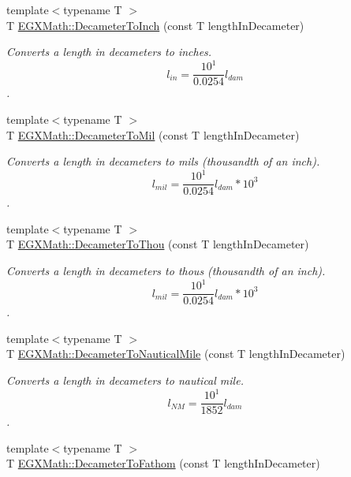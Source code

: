 \begin{DoxyCompactItemize}
{\footnotesize template$<$typename T $>$ }\\T \mbox{\hyperlink{group___e_g_x_math-_conversions-_length_conversions-_s_i-_decameter-_imperial_ga246ab50e821640008d965b5690226df5}{E\+G\+X\+Math\+::\+Decameter\+To\+Inch}} (const T length\+In\+Decameter)
\begin{DoxyCompactList}\small\item\em Converts a length in decameters to inches. \[ l_{in}= \frac{10^{1}}{0.0254} l_{dam} \]. \end{DoxyCompactList}\item 
{\footnotesize template$<$typename T $>$ }\\T \mbox{\hyperlink{group___e_g_x_math-_conversions-_length_conversions-_s_i-_decameter-_imperial_gaee77251b6c2f2e8e0feae0032e80e0c3}{E\+G\+X\+Math\+::\+Decameter\+To\+Mil}} (const T length\+In\+Decameter)
\begin{DoxyCompactList}\small\item\em Converts a length in decameters to mils (thousandth of an inch). \[ l_{mil}= \frac{10^{1}}{0.0254} l_{dam} * 10^{3} \]. \end{DoxyCompactList}\item 
{\footnotesize template$<$typename T $>$ }\\T \mbox{\hyperlink{group___e_g_x_math-_conversions-_length_conversions-_s_i-_decameter-_imperial_ga4f21f4b1df62d1d63f46849c4f38d56b}{E\+G\+X\+Math\+::\+Decameter\+To\+Thou}} (const T length\+In\+Decameter)
\begin{DoxyCompactList}\small\item\em Converts a length in decameters to thous (thousandth of an inch). \[ l_{mil}= \frac{10^{1}}{0.0254} l_{dam} * 10^{3} \]. \end{DoxyCompactList}\item 
{\footnotesize template$<$typename T $>$ }\\T \mbox{\hyperlink{group___e_g_x_math-_conversions-_length_conversions-_s_i-_decameter-_nautical_ga099c662953d7c82d538755bd699993b1}{E\+G\+X\+Math\+::\+Decameter\+To\+Nautical\+Mile}} (const T length\+In\+Decameter)
\begin{DoxyCompactList}\small\item\em Converts a length in decameters to nautical mile. \[ l_{NM}= \frac{10^{1}}{1852} l_{dam} \]. \end{DoxyCompactList}\item 
{\footnotesize template$<$typename T $>$ }\\T \mbox{\hyperlink{group___e_g_x_math-_conversions-_length_conversions-_s_i-_decameter-_nautical_ga26e58af8b0bdc9bfb22635741a498217}{E\+G\+X\+Math\+::\+Decameter\+To\+Fathom}} (const T length\+In\+Decameter)

\end{DoxyCompactItemize}
